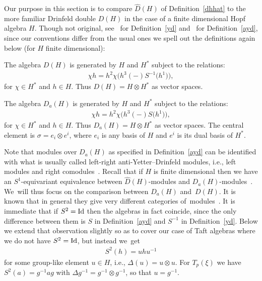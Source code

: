 \documentclass[pdftex]{sigma}
\numberwithin{equation}{section}
\newcommand{\ot}{\otimes}
\begin{document}
Our purpose in this section is to compare $\widehat{D}(H)$ of Definition~\ref{dhhat} to the more familiar Drinfeld double $D(H)$ in the case of a finite dimensional Hopf algebra $H$. Though not original, see~\cite{quantumgroups} for Definition~\ref{yd} and~\cite{HKRS2} for Definition~\ref{ayd}, since our conventions differ from the usual ones we spell out the definitions again below (for $H$ finite dimensional):

\begin{Definition}\label{yd}
The algebra $D(H)$ is generated by $H$ and $H^*$ subject to the relations:
\begin{gather}
\chi h=h^2\chi\big(h^3(-)S^{-1}\big(h^1\big)\big),
\end{gather}
for $\chi\in H^*$ and $h\in H$. Thus $D(H)=H\ot H^*$ as vector spaces.
\end{Definition}

\begin{Definition}\label{ayd}
The algebra $D_a(H)$ is generated by $H$ and $H^*$ subject to the relations:
\begin{gather}
\chi h=h^2\chi\big(h^3(-)S\big(h^1\big)\big),
\end{gather}
for $\chi\in H^*$ and $h\in H$. Thus $D_a(H)=H\ot H^*$ as vector spaces. The central element is $\sigma=e_i\ot e^i$, where $e_i$ is any basis of $H$ and $e^i$ is its dual basis of $H^*$.
\end{Definition}

Note that modules over $D_a(H)$ as specified in Definition~\ref{ayd} can be identified with what is usually called left-right anti-Yetter--Drinfeld modules, i.e., left modules and right como\-du\-les~\cite{HKRS2}. Recall that if $H$ is finite dimensional then we have an $S^1$-equivariant equivalence between $\widehat{D}(H)$-modules and $D_a(H)$-modules~\cite{s2}. We~will thus focus on the comparison between $D_a(H)$ and~$D(H)$. It is known that in general they give very different categories of~modules~\cite{gentaft}. It is immediate that if $S^2={\rm Id}$ then the algebras in fact coincide, since the only difference bet\-ween them is $S$ in Definition~\ref{ayd} and $S^{-1}$ in Definition~\ref{yd}. Below we extend that observation slightly so as to cover our case of Taft algebras where we do not have $S^2={\rm Id}$, but instead we~get
\begin{gather}
S^2(h)=uhu^{-1}
\end{gather}
for some group-like element $u\in H$, i.e., $\Delta(u)=u\ot u$. For $T_p(\xi)$ we have $S^2(a)=g^{-1}ag$ with $\Delta g^{-1}=g^{-1} \ot g^{-1}$, so that $u=g^{-1}$.
\end{document}
